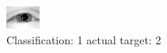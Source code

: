 \begin{figure}[h!]
\begin{center}
\includegraphics[width=0.60\columnwidth]{figures/ID2280_class_1_target_2.png}
\end{center}
\caption{ Classification: 1 actual target: 2}
\label{fig:ID2280_class_1_target_2}
\end{figure}
